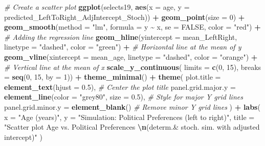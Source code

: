 \documentclass[
]{book}
\newenvironment{Shaded}{\begin{snugshade}}{\end{snugshade}}
\newcommand{\AttributeTok}[1]{\textcolor[rgb]{0.13,0.29,0.53}{#1}}
\newcommand{\CommentTok}[1]{\textcolor[rgb]{0.56,0.35,0.01}{\textit{#1}}}
\newcommand{\ConstantTok}[1]{\textcolor[rgb]{0.56,0.35,0.01}{#1}}
\newcommand{\DecValTok}[1]{\textcolor[rgb]{0.00,0.00,0.81}{#1}}
\newcommand{\FloatTok}[1]{\textcolor[rgb]{0.00,0.00,0.81}{#1}}
\newcommand{\FunctionTok}[1]{\textcolor[rgb]{0.13,0.29,0.53}{\textbf{#1}}}
\newcommand{\NormalTok}[1]{#1}
\newcommand{\SpecialCharTok}[1]{\textcolor[rgb]{0.81,0.36,0.00}{\textbf{#1}}}
\newcommand{\StringTok}[1]{\textcolor[rgb]{0.31,0.60,0.02}{#1}}
\begin{document}
\begin{Shaded}
\begin{Highlighting}[]
\CommentTok{\# Create a scatter plot}
\FunctionTok{ggplot}\NormalTok{(selects19, }\FunctionTok{aes}\NormalTok{(}\AttributeTok{x =}\NormalTok{ age, }\AttributeTok{y =}\NormalTok{ predicted\_LeftToRight\_AdjIntercept\_Stoch)) }\SpecialCharTok{+}
  \FunctionTok{geom\_point}\NormalTok{(}\AttributeTok{size =} \DecValTok{0}\NormalTok{) }\SpecialCharTok{+}
  \FunctionTok{geom\_smooth}\NormalTok{(}\AttributeTok{method =} \StringTok{"lm"}\NormalTok{, }\AttributeTok{formula =}\NormalTok{ y }\SpecialCharTok{\textasciitilde{}}\NormalTok{ x, }\AttributeTok{se =} \ConstantTok{FALSE}\NormalTok{, }\AttributeTok{color =} \StringTok{"red"}\NormalTok{) }\SpecialCharTok{+}  \CommentTok{\# Adding the regression line}
  \FunctionTok{geom\_hline}\NormalTok{(}\AttributeTok{yintercept =}\NormalTok{ mean\_LeftRight, }\AttributeTok{linetype =} \StringTok{"dashed"}\NormalTok{, }\AttributeTok{color =} \StringTok{"green"}\NormalTok{) }\SpecialCharTok{+}  \CommentTok{\# Horizontal line at the mean of y}
  \FunctionTok{geom\_vline}\NormalTok{(}\AttributeTok{xintercept =}\NormalTok{ mean\_age, }\AttributeTok{linetype =} \StringTok{"dashed"}\NormalTok{, }\AttributeTok{color =} \StringTok{"orange"}\NormalTok{) }\SpecialCharTok{+}  \CommentTok{\# Vertical line at the mean of x}
  \FunctionTok{scale\_y\_continuous}\NormalTok{(}
    \AttributeTok{limits =} \FunctionTok{c}\NormalTok{(}\DecValTok{0}\NormalTok{, }\DecValTok{15}\NormalTok{),}
    \AttributeTok{breaks =} \FunctionTok{seq}\NormalTok{(}\DecValTok{0}\NormalTok{, }\DecValTok{15}\NormalTok{, }\AttributeTok{by =} \DecValTok{1}\NormalTok{)) }\SpecialCharTok{+}
  \FunctionTok{theme\_minimal}\NormalTok{() }\SpecialCharTok{+}
  \FunctionTok{theme}\NormalTok{(}
    \AttributeTok{plot.title =} \FunctionTok{element\_text}\NormalTok{(}\AttributeTok{hjust =} \FloatTok{0.5}\NormalTok{), }\CommentTok{\# Center the plot title}
    \AttributeTok{panel.grid.major.y =} \FunctionTok{element\_line}\NormalTok{(}\AttributeTok{color =} \StringTok{"grey80"}\NormalTok{, }\AttributeTok{size =} \FloatTok{0.5}\NormalTok{), }\CommentTok{\# Style for major Y grid lines}
    \AttributeTok{panel.grid.minor.y =} \FunctionTok{element\_blank}\NormalTok{() }\CommentTok{\# Remove minor Y grid lines}
\NormalTok{  ) }\SpecialCharTok{+}
  \FunctionTok{labs}\NormalTok{(}
    \AttributeTok{x =} \StringTok{"Age (years)"}\NormalTok{,}
    \AttributeTok{y =} \StringTok{"Simulation: Political Preferences (left to right)"}\NormalTok{,}
    \AttributeTok{title =} \StringTok{"Scatter plot Age vs. Political Preferences }\SpecialCharTok{\textbackslash{}n}\StringTok{(determ.\& stoch. sim. with adjusted intercept)"}
\NormalTok{  )}
\end{Highlighting}
\end{Shaded}
\end{document}
